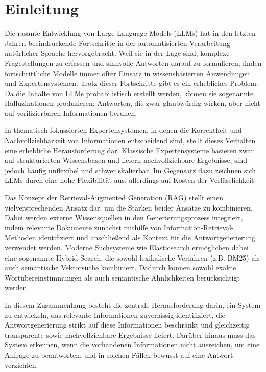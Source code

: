 \section{Einleitung}
\label{Hauptkapitel:Einleitung}
Die rasante Entwicklung von Large Language Models (LLMs) hat in den letzten Jahren beeindruckende Fortschritte in der automatisierten Verarbeitung natürlicher Sprache hervorgebracht. Weil sie in der Lage sind, komplexe Fragestellungen zu erfassen und sinnvolle Antworten darauf zu formulieren, finden fortschrittliche Modelle immer öfter Einsatz in wissensbasierten Anwendungen und Expertensystemen.  Trotz dieser Fortschritte gibt es ein erhebliches Problem:  Da die Inhalte von LLMs probabilistisch erstellt werden, können sie sogenannte Halluzinationen produzieren: Antworten, die zwar glaubwürdig wirken, aber nicht auf verifizierbaren Informationen beruhen.

In thematisch fokussierten Expertensystemen, in denen die Korrektheit und Nachvollziehbarkeit von Informationen entscheidend sind, stellt dieses Verhalten eine erhebliche Herausforderung dar. Klassische Expertensysteme basieren zwar auf strukturierten Wissensbasen und liefern nachvollziehbare Ergebnisse, sind jedoch häufig unflexibel und schwer skalierbar. Im Gegensatz dazu zeichnen sich LLMs durch eine hohe Flexibilität aus, allerdings auf Kosten der Verlässlichkeit.

Das Konzept der Retrieval-Augmented Generation (RAG) stellt einen vielversprechenden Ansatz dar, um die Stärken beider Ansätze zu kombinieren. Dabei werden externe Wissensquellen in den Generierungsprozess integriert, indem relevante Dokumente zunächst mithilfe von Information-Retrieval-Methoden identifiziert und anschließend als Kontext für die Antwortgenerierung verwendet werden. Moderne Suchsysteme wie Elasticsearch ermöglichen dabei eine sogenannte Hybrid Search, die sowohl lexikalische Verfahren (z.B. BM25) als auch semantische Vektorsuche kombiniert. Dadurch können sowohl exakte Wortübereinstimmungen als auch semantische Ähnlichkeiten berücksichtigt werden.

In diesem Zusammenhang besteht die zentrale Herausforderung darin, ein System zu entwickeln, das relevante Informationen zuverlässig identifiziert, die Antwortgenerierung strikt auf diese Informationen beschränkt und gleichzeitig transparente sowie nachvollziehbare Ergebnisse liefert. Darüber hinaus muss das System erkennen, wenn die vorhandenen Informationen nicht ausreichen, um eine Anfrage zu beantworten, und in solchen Fällen bewusst auf eine Antwort verzichten.

